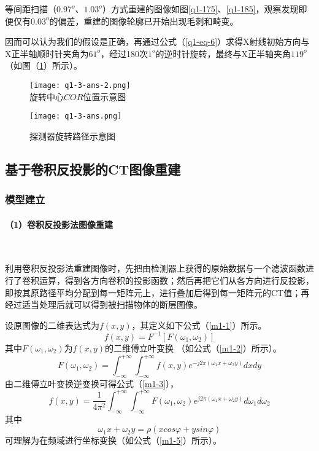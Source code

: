 \documentclass[withoutpreface,bwprint]{cumcmthesis} %
\begin{document}
等间距扫描（$0.97^o$、$1.03^o$）方式重建的图像如图\ref{q1-175}、\ref{q1-185}，观察发现即便仅有$0.03^o$的偏差，重建的图像轮廓已开始出现毛刺和畸变。

因而可以认为我们的假设是正确，再通过公式（\ref{q1-eq-6}）求得X射线初始方向与X正半轴顺时针夹角为$61^o$，经过180次$1^o$的逆时针旋转，最终与X正半轴夹角$119^o$（如图（\ref{fig:q1-3-ans}）所示）。
\begin{figure}[!htbp]  
\begin{minipage}[t]{0.5\textwidth}
\centering  
\texttt{[image: q1-3-ans-2.png]} \\
\caption{旋转中心$COR$位置示意图} \label{fig:q1-3-ans2}
\end{minipage}
\hspace{1ex}
\begin{minipage}[t]{0.5\textwidth}  
\centering  
\texttt{[image: q1-3-ans.png]}\\
\caption{探测器旋转路径示意图}  \label{fig:q1-3-ans}
\end{minipage}  
\end{figure} 

\newpage
\subsection{基于卷积反投影的CT图像重建}
\subsubsection{模型建立}
\paragraph*{（1）卷积反投影法图像重建}~\\
\par 利用卷积反投影法重建图像时，先把由检测器上获得的原始数据与一个滤波函数进行了卷积运算，得到各方向卷积的投影函数；然后再把它们从各方向进行反投影，即按其原路径平均分配到每一矩阵元上，进行叠加后得到每一矩阵元的CT值；再经过适当处理后就可以得到被扫描物体的断层图像。

\par 设原图像的二维表达式为$f(x,y)$，其定义如下公式（\ref{m1-1}）所示。
\begin{equation}
\label{m1-1}
	f(x,y) = F^{-1} [F(\omega_1, \omega_2)]
\end{equation}
其中$F(\omega_1,\omega_2)$为$f(x,y)$的二维傅立叶变换
（如公式（\ref{m1-2}）所示）。
\begin{equation}
	\label{m1-2}
	F(\omega_1,\omega_2) = \int^{+\infty}_{-\infty}\int^{+\infty}_{-\infty} f(x,y) e^{-j2\pi(\omega_1 x + \omega_2 y)} dxdy
\end{equation}
由二维傅立叶变换逆变换可得公式（\ref{m1-3}），
\begin{equation}
	\label{m1-3}
	f(x,y) =\frac{1}{4\pi^2} \int^{+\infty}_{-\infty}\int^{+\infty}_{-\infty} F(\omega_1,\omega_2) e^{j2\pi(\omega_1 x + \omega_2 y)} d\omega_1 d\omega_2
\end{equation}
其中
\begin{equation}
	\label{m1-4}
	\omega_1 x + \omega_2 y = \rho (xcos\varphi +ysin\varphi)
\end{equation}
可理解为在频域进行坐标变换（如公式（\ref{m1-5}）所示）。
\end{document}
